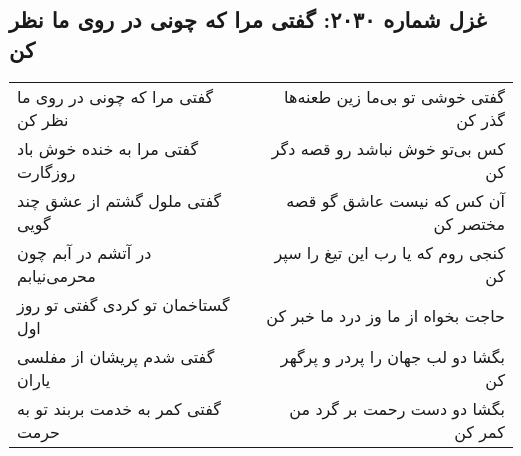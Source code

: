 \begin{center}
\section*{غزل شماره ۲۰۳۰: گفتی مرا که چونی در روی ما نظر کن}
\label{sec:2030}
\begin{longtable}{l p{0.5cm} r}
گفتی مرا که چونی در روی ما نظر کن
&&
گفتی خوشی تو بی‌ما زین طعنه‌ها گذر کن
\\
گفتی مرا به خنده خوش باد روزگارت
&&
کس بی‌تو خوش نباشد رو قصه دگر کن
\\
گفتی ملول گشتم از عشق چند گویی
&&
آن کس که نیست عاشق گو قصه مختصر کن
\\
در آتشم در آبم چون محرمی‌نیابم
&&
کنجی روم که یا رب این تیغ را سپر کن
\\
گستاخمان تو کردی گفتی تو روز اول
&&
حاجت بخواه از ما وز درد ما خبر کن
\\
گفتی شدم پریشان از مفلسی یاران
&&
بگشا دو لب جهان را پردر و پرگهر کن
\\
گفتی کمر به خدمت بربند تو به حرمت
&&
بگشا دو دست رحمت بر گرد من کمر کن
\\
\end{longtable}
\end{center}
